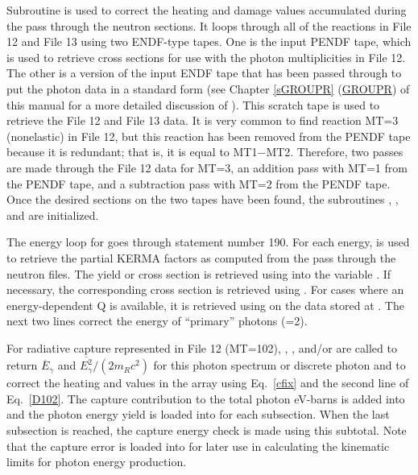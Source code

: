 Subroutine 
is used to correct the heating and damage values accumulated
during the pass through the neutron sections.  It loops through
all of the reactions in File 12 and File 13 using two
ENDF-type tapes.  One is the input PENDF tape, which is used
to retrieve cross sections for use with the photon
multiplicities in File 12.  The other is a version of
the input ENDF tape that has been passed through
 to put the photon
data in a standard form (see
Chapter \ref{sGROUPR} (\hyperlink{sGROUPRhy}{GROUPR})
 of this manual for a more detailed
discussion of ).
This scratch tape is used to retrieve the File 12 and File 13
data.  It is very common to find reaction MT=3 (nonelastic)
in File 12, but this reaction has been removed from the PENDF
tape because it is redundant; that is, it is equal to MT1$-$MT2.
 Therefore, two passes are made through the File 12 data for
MT=3, an addition pass with MT=1 from the PENDF tape, and
a subtraction pass with MT=2 from the PENDF tape.  Once the
desired sections on the two tapes have been found, the subroutines
,
,
and  are initialized.

The energy loop for  goes through statement
number 190.  For each energy, 
is used to retrieve the partial KERMA factors as computed from the
pass through the neutron files.  The yield or cross section is
retrieved using  into the
variable .  If necessary, the corresponding cross section
 is retrieved using .
For cases where an
energy-dependent Q is available, it is retrieved using
 on the data stored at
.  The next two lines correct the energy of ``primary''
photons (=2).

For radiative capture represented in File 12 (MT=102),
,
, and/or
 are
called to return $\overline{E}_\gamma$ and
$\overline{E^2_\gamma}/(2m_Rc^2)$ for this photon spectrum
or discrete photon and to correct the heating and values
in the  array using Eq.~\ref{cfix} and the second
line of Eq.~\ref{D102}.  The capture contribution to the
total photon eV-barns is added into  and
the photon energy yield is loaded into  for
each subsection.  When the last subsection is reached, the
capture energy check is made using this subtotal.  Note
that the capture error is loaded into 
for later use in calculating the kinematic limits for
photon energy production.

